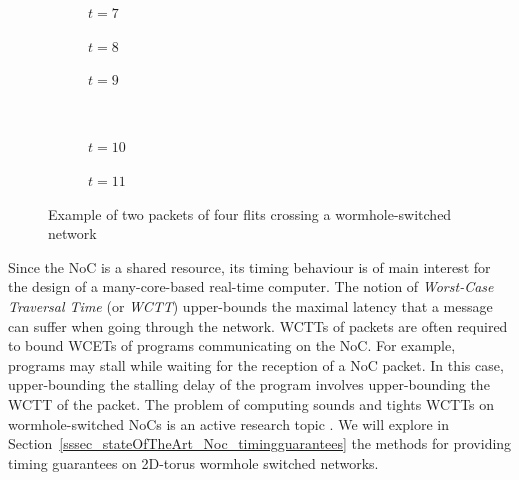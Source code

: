 \documentclass[main.tex]{subfiles}
\begin{document}
\begin{example}
\begin{figure}
        \vspace{10mm}

        \begin{subfigure}[b]{0.3\linewidth}
        \centering
            \scalebox{0.25}{}
            \caption{$t=7$}
        \end{subfigure}
         \hspace{5mm}
        \begin{subfigure}[b]{0.3\linewidth}
        \centering
            \scalebox{0.25}{}
            \caption{$t=8$}
        \end{subfigure}
         \hspace{5mm}
        \begin{subfigure}[b]{0.3\linewidth}
        \centering
            \scalebox{0.25}{}
            \caption{$t=9$}
        \end{subfigure} \\

        \vspace{10mm}

        \begin{subfigure}[b]{0.3\linewidth}
        \centering
            \scalebox{0.25}{}
            \caption{$t=10$}
        \end{subfigure}
         \hspace{1cm}
        \begin{subfigure}[b]{0.3\linewidth}
        \centering
            \scalebox{0.25}{}
            \caption{$t=11$}
        \end{subfigure}

        \caption{Example of two packets of four flits crossing a
        wormhole-switched network}
        \label{fig_stateOfTheArt_exampleWormhole}

    \end{figure}

\end{example}

Since the NoC is a shared resource, its timing behaviour is of main interest
for the design of a many-core-based real-time computer. The notion of
\emph{Worst-Case Traversal Time} (or \emph{WCTT}) upper-bounds the maximal
latency that a message can suffer when going through the network. WCTTs of
packets are often required to bound WCETs of programs communicating on the NoC.
For example, programs may stall while waiting for the reception of a NoC
packet. In this case, upper-bounding the stalling delay of the program involves
upper-bounding the WCTT of the packet. The problem of computing sounds and
tights WCTTs on wormhole-switched NoCs is an active research topic
\cite{Lu2005, Qian2010, Dinechin2014, Giannopoulou2015}. We will explore in
Section~\ref{sssec_stateOfTheArt_Noc_timingguarantees} the methods for
providing timing guarantees on 2D-torus wormhole switched networks. 
\end{document}
